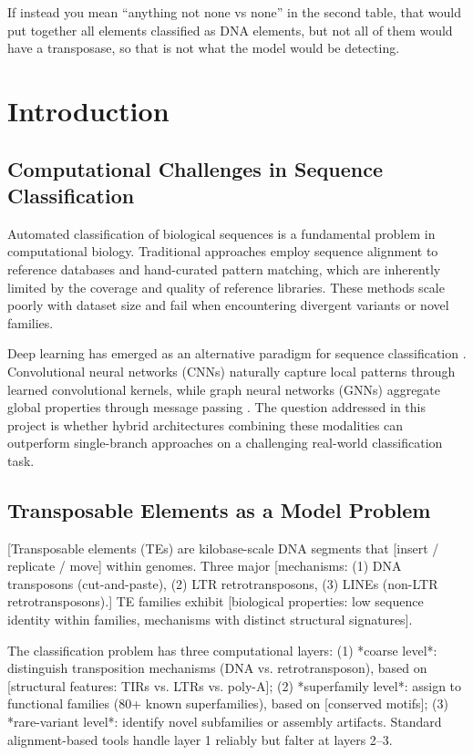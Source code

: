 \documentclass[12pt]{article}
\begin{document}
If instead you mean “anything not none vs none” in the second table, that would put together all elements classified as DNA elements, but not all of them would have a transposase, so that is not what the model would be detecting.

\fi

\newpage
\section{Introduction}

\subsection{Computational Challenges in Sequence Classification}

Automated classification of biological sequences is a fundamental problem in computational biology. Traditional approaches employ sequence alignment to reference databases and hand-curated pattern matching, which are inherently limited by the coverage and quality of reference libraries. These methods scale poorly with dataset size and fail when encountering divergent variants or novel families.

Deep learning has emerged as an alternative paradigm for sequence classification \cite{lecun2015deep,goodfellow2016deep}. Convolutional neural networks (CNNs) naturally capture local patterns through learned convolutional kernels, while graph neural networks (GNNs) aggregate global properties through message passing \cite{kipf2016semi,hamilton2017inductive}. The question addressed in this project is whether hybrid architectures combining these modalities can outperform single-branch approaches on a challenging real-world classification task.

\iffalse
\subsection{Transposable Elements as a Model Problem}

[Transposable elements (TEs) are kilobase-scale DNA segments that [insert / replicate / move] within genomes. Three major [mechanisms: (1) DNA transposons (cut-and-paste), (2) LTR retrotransposons, (3) LINEs (non-LTR retrotransposons).] TE families exhibit [biological properties: low sequence identity within families, mechanisms with distinct structural signatures].

The classification problem has three computational layers: (1) *coarse level*: distinguish transposition mechanisms (DNA vs. retrotransposon), based on [structural features: TIRs vs. LTRs vs. poly-A]; (2) *superfamily level*: assign to functional families (80+ known superfamilies), based on [conserved motifs]; (3) *rare-variant level*: identify novel subfamilies or assembly artifacts. Standard alignment-based tools handle layer 1 reliably but falter at layers 2--3.
\end{document}
